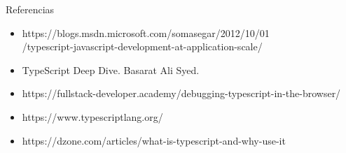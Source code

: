 \documentclass{beamer}
\begin{document}
\begin{frame}{Referencias}
\begin{itemize}  
	\item https://blogs.msdn.microsoft.com/somasegar/2012/10/01 \\ /typescript-javascript-development-at-application-scale/
	\item TypeScript Deep Dive. Basarat Ali Syed. 
	\item https://fullstack-developer.academy/debugging-typescript-in-the-browser/
	\item https://www.typescriptlang.org/
	\item https://dzone.com/articles/what-is-typescript-and-why-use-it
\end{itemize}
\end{frame}
\end{document}
